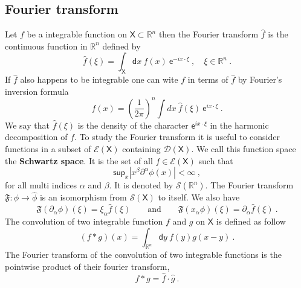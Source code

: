 \documentclass[12pt]{book}
\renewcommand{\sup}{\mathsf{sup}}
\newcommand{\abs}[1]{\left|#1\right|}
\let\int\int
\newcommand{\Dcal}{\mathcal{D}}
\newcommand{\Ecal}{\mathcal{E}}
\newcommand{\Scal}{\mathcal{S}}
\newcommand{\Rbb}{\mathbb{R}}
\newcommand{\Frak}{\mathfrak{F}}
\newcommand{\Xsf}{\mathsf{X}}
\newcommand{\dsf}{\mathsf{d}}
\newcommand{\esf}{\mathsf{e}}
\theoremstyle{break}
\begin{document}
\subsection{Fourier transform}


Let $f$ be a integrable function on $\Xsf \subset \Rbb^n$ then the Fourier transform $\hat{f}$ is the continuous function in $\Rbb^n$ defined by
%
\begin{equation*}
\hat{f}(\xi) = \int_\Xsf \dsf x \ f(x) \ \esf^{-i x \cdot \xi} \ , \quad \xi \in \Rbb^n \ .
\end{equation*}
%
If $\hat{f}$ also happens to be integrable one can wite $f$ in terms of $\hat{f}$ by Fourier's inversion formula
%
\begin{equation*}
f(x) = \left(\frac{1}{2\pi}\right)^n \int dx \ \hat{f}(\xi) \ \esf^{i x \cdot \xi} \ .
\end{equation*}
%
We say that $\hat{f}(\xi)$ is the density of the character $\esf^{i x \cdot \xi}$ in the harmonic decomposition of $f$. To study the Fourier transform it is useful to consider functions in a subset of $\Ecal(\Xsf)$ containing $\Dcal(\Xsf)$. We call this function space the \textbf{Schwartz space}. It is the set of all $f \in \Ecal(\Xsf)$ such that 
%
\begin{equation*}
\sup_x \abs{x^\beta \partial^\alpha \phi(x)} < \infty \ ,
\end{equation*}
%
for all multi indices $\alpha$ and $\beta$. It is denoted by $\Scal(\Rbb^n)$. The Fourier transform $\Frak : \phi \to \hat{\phi}$ is an isomorphism from $\Scal(\Xsf)$ to itself. We also have 
%
\begin{equation*}
\Frak(\partial_\alpha \phi)(\xi) = \xi_\alpha \hat{f}(\xi) \qquad \mbox{and} \qquad \Frak(x_\alpha \phi)(\xi) = \partial_\alpha \hat{f}(\xi) \ .
\end{equation*}
%
The convolution of two integrable function $f$ and $g$ on $\Xsf$ is defined as follow
%
\begin{equation*}
( f \ast g )(x) = \int_{\Rbb^n} \dsf y \ f(y) g(x-y) \ .
\end{equation*}
%
The Fourier transform of the convolution of two integrable functions is the pointwise product of their fourier transform,
%
\begin{equation*}
f \ast g = \hat{f} \cdot \hat{g} \ . 
\end{equation*}
\end{document}
